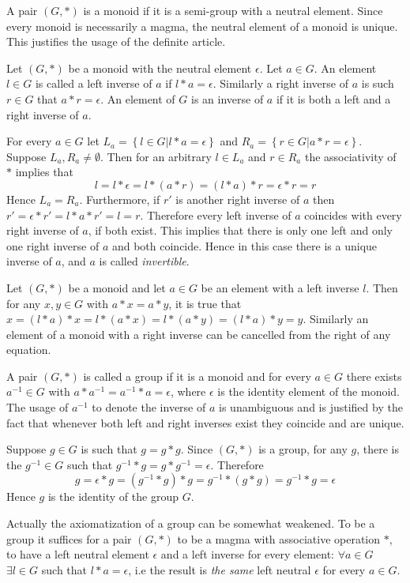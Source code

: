 \documentclass[a4paper]{article}
\newcommand{\obj}[1]{\left\{{#1}\right\}}
\newcommand{\brac}[1]{{\left({#1}\right)}}
\begin{document}
A pair $\brac{G, \ast}$ is a monoid if it is a semi-group with a neutral element. Since every monoid is necessarily a magma, the neutral element of a monoid is unique. This justifies the usage of the definite article.

Let $\brac{G, \ast}$ be a monoid with the neutral element $\epsilon$. Let $a\in G$. An element $l\in G$ is called a left inverse of $a$ if $l\ast a = \epsilon$. Similarly a right inverse of $a$ is such $r\in G$ that $a\ast r = \epsilon$. An element of $G$ is an inverse of $a$ if it is both a left and a right inverse of $a$.

For every $a\in G$ let $L_a=\obj{l\in G\vert l\ast a = \epsilon}$ and $R_a=\obj{r\in G\vert a\ast r= \epsilon}$. Suppose $L_a, R_a\neq \emptyset$. Then for an arbitrary $l\in L_a$ and $r\in R_a$ the associativity of $\ast$ implies that\[l = l\ast \epsilon = l\ast \brac{a\ast r} = \brac{l\ast a}\ast r = \epsilon\ast r= r\] Hence $L_a=R_a$. Furthermore, if $r'$ is another right inverse of $a$ then $r'=\epsilon\ast r' = l\ast a\ast r' = l = r$. Therefore every left inverse of $a$ coincides with every right inverse of $a$, if both exist. This implies that there is only one left and only one right inverse of $a$ and both coincide. Hence in this case there is a unique inverse of $a$, and $a$ is called \emph{invertible}.

Let $\brac{G, \ast}$ be a monoid and let $a\in G$ be an element with a left inverse $l$. Then for any $x,y\in G$ with $a\ast x= a\ast y$, it is true that $x = \brac{l\ast a}\ast x = l\ast \brac{a\ast x} = l\ast \brac{a\ast y} = \brac{l\ast a}\ast y = y$. Similarly an element of a monoid with a right inverse can be cancelled from the right of any equation.

A pair $\brac{G, \ast}$ is called a group if it is a monoid and for every $a\in G$ there exists $a^{-1}\in G$ with $a\ast a^{-1} = a^{-1}\ast a = \epsilon$, where $\epsilon$ is the identity element of the monoid. The usage of $a^{-1}$ to denote the inverse of $a$ is unambiguous and is justified by the fact that whenever both left and right inverses exist they coincide and are unique.

Suppose $g\in G$ is such that $g = g\ast g$. Since $\brac{G, \ast}$ is a group, for any $g$, there is the $g^{-1}\in G$ such that $g^{-1}\ast g = g\ast g^{-1} = \epsilon$. Therefore \[g = \epsilon\ast g = \brac{g^{-1}\ast g}\ast g = g^{-1}\ast \brac{g\ast g} = g^{-1}\ast g = \epsilon\] Hence $g$ is the identity of the group $G$.

Actually the axiomatization of a group can be somewhat weakened. To be a group it suffices for a pair $\brac{G, \ast}$ to be a magma with associative operation $\ast$, to have a left neutral element $\epsilon$ and a left inverse for every element: $\forall a\in G$ $\exists l\in G$ such that $l\ast a = \epsilon$, i.e the result is \emph{the same} left neutral $\epsilon$ for every $a\in G$.
\end{document}
